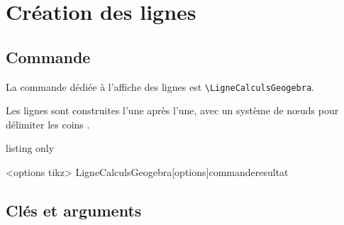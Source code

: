 \documentclass[french,a4paper,11pt]{article}
\begin{document}
\begin{PresentationCode}{}
\begin{CalculFormelGeogebra}
	[CouleurEntete=green!25,PoliceEntete=\LARGE\ttfamily,
	Titre={$\blacktriangleright$ Illustration via GeoGebra},Largeur=13]
\end{CalculFormelGeogebra}
\end{PresentationCode}

\pagebreak

\section{Création des lignes}

\subsection{Commande}

\begin{cautionblock}
La commande dédiée à l'affiche des lignes est \texttt{\textbackslash LigneCalculsGeogebra}.

Les lignes sont construites l'une après l'une, avec un système de nœuds pour délimiter les \og coins \fg.
\end{cautionblock}

\begin{PresentationCode}{listing only}
\begin{CalculFormelGeogebra}<options tikz>
	LigneCalculsGeogebra[options]{commande}{resultat}
\end{CalculFormelGeogebra}
\end{PresentationCode}

\begin{PresentationCode}{}
\begin{CalculFormelGeogebra}
\end{CalculFormelGeogebra}
\end{PresentationCode}

\subsection{Clés et arguments}
\end{document}
